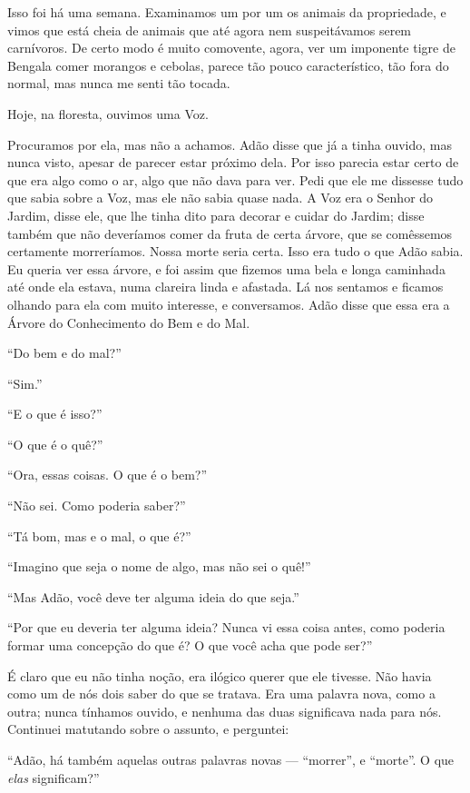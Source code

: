 Isso foi há uma semana. Examinamos um por um os animais da propriedade, e vimos que
está cheia de animais que até agora nem suspeitávamos serem carnívoros. De
certo modo é muito comovente, agora, ver um imponente tigre de Bengala comer
morangos e cebolas, parece tão pouco característico, tão fora do normal, mas nunca
me senti tão tocada.

Hoje, na floresta, ouvimos uma Voz.

Procuramos por ela, mas não a achamos. Adão disse que já a tinha ouvido, mas nunca
visto, apesar de parecer estar próximo dela. Por isso parecia estar certo de que
era algo como o ar, algo que não dava para ver. Pedi que ele me dissesse tudo que
sabia sobre a Voz, mas ele não sabia quase nada. A Voz era o Senhor do Jardim,
disse ele, que lhe tinha dito para decorar e cuidar do Jardim; disse também que
não deveríamos comer da fruta de certa árvore, que se comêssemos
certamente morreríamos. Nossa morte seria certa. Isso era tudo o que Adão sabia. Eu queria
ver essa árvore, e foi assim que fizemos uma bela e longa caminhada até onde ela
estava, numa clareira linda e afastada. Lá nos sentamos e
ficamos olhando para ela com muito interesse, e conversamos. Adão disse que essa
era a Árvore do Conhecimento do Bem e do Mal.

“Do bem e do mal?”

“Sim.”

“E o que é isso?”

“O que é o quê?”

“Ora, essas coisas. O que é o bem?”

“Não sei. Como poderia saber?”

“Tá bom, mas e o mal, o que é?”

“Imagino que seja o nome de algo, mas não sei o quê!”

“Mas Adão, você deve ter alguma ideia do que seja.”

“Por que eu deveria ter alguma ideia? Nunca vi essa coisa antes, como
poderia formar uma concepção do que é? O que você acha que pode ser?”

É claro que eu não tinha noção, era ilógico querer que ele tivesse.
Não havia como um de nós dois saber do que se tratava. Era uma palavra nova, como
a outra; nunca tínhamos ouvido, e nenhuma das duas significava nada para nós. 
Continuei matutando sobre o assunto, e perguntei:

“Adão, há também aquelas outras palavras novas --- “morrer”, e “morte”. O que
\textit{elas} significam?”

